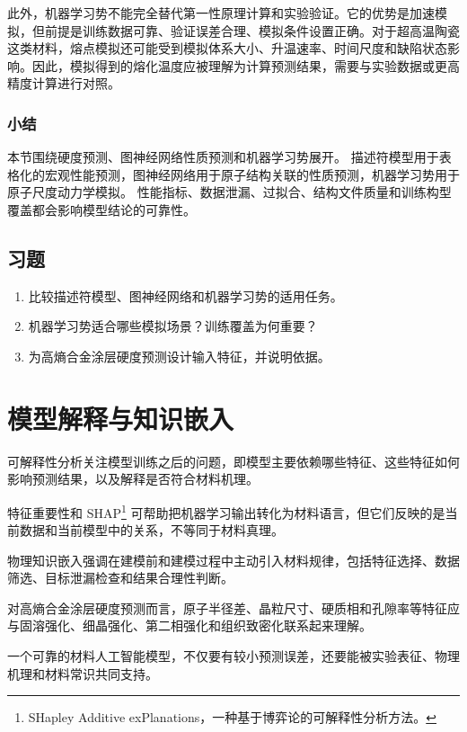 此外，机器学习势不能完全替代第一性原理计算和实验验证。它的优势是加速模拟，但前提是训练数据可靠、验证误差合理、模拟条件设置正确。对于超高温陶瓷这类材料，熔点模拟还可能受到模拟体系大小、升温速率、时间尺度和缺陷状态影响。因此，模拟得到的熔化温度应被理解为计算预测结果，需要与实验数据或更高精度计算进行对照。

\subsubsection*{\textbf{小结}}

本节围绕硬度预测、图神经网络性质预测和机器学习势展开。
描述符模型用于表格化的宏观性能预测，图神经网络用于原子结构关联的性质预测，机器学习势用于原子尺度动力学模拟。
性能指标、数据泄漏、过拟合、结构文件质量和训练构型覆盖都会影响模型结论的可靠性。

\subsection*{习题}

\begin{enumerate}[leftmargin=*]
\item 比较描述符模型、图神经网络和机器学习势的适用任务。
\item 机器学习势适合哪些模拟场景？训练覆盖为何重要？
\item 为高熵合金涂层硬度预测设计输入特征，并说明依据。
\end{enumerate}

\clearpage
\section{模型解释与知识嵌入}


\begin{sectionkeypoints}
\item 可解释性分析关注模型训练之后的问题，即模型主要依赖哪些特征、这些特征如何影响预测结果，以及解释是否符合材料机理。
\item 特征重要性和 SHAP\footnote{SHapley Additive exPlanations，一种基于博弈论的可解释性分析方法。} 可帮助把机器学习输出转化为材料语言，但它们反映的是当前数据和当前模型中的关系，不等同于材料真理。
\item 物理知识嵌入强调在建模前和建模过程中主动引入材料规律，包括特征选择、数据筛选、目标泄漏检查和结果合理性判断。
\item 对高熵合金涂层硬度预测而言，原子半径差、晶粒尺寸、硬质相和孔隙率等特征应与固溶强化、细晶强化、第二相强化和组织致密化联系起来理解。
\item 一个可靠的材料人工智能模型，不仅要有较小预测误差，还要能被实验表征、物理机理和材料常识共同支持。
\end{sectionkeypoints}

